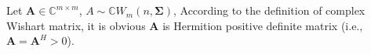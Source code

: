 \documentclass[12pt, draftclsnofoot, onecolumn]{IEEEtran}
\begin{document}

%


\appendices
\section{}\label{log expectation of OM}
Let $\mathbf{A}\in \mathbb{C}^{m\times m}$, $A\sim \mathbb{C}W_{m}(n, \mathbf{\Sigma})$, According to the definition of complex Wishart matrix, it is obvious $\mathbf{A}$ is Hermition positive definite matrix (i.e., $\mathbf{A}=\mathbf{A}^{H}>0$).
\end{document}
